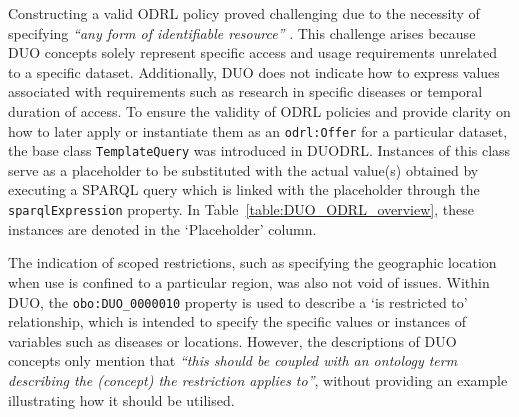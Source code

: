 Constructing a valid ODRL policy proved challenging due to the necessity of specifying \textit{``any form of identifiable resource''} \citep{iannella_odrl_vocab_2018}.
This challenge arises because DUO concepts solely represent specific access and usage requirements unrelated to a specific dataset.
Additionally, DUO does not indicate how to express values associated with requirements such as research in specific diseases or temporal duration of access.
To ensure the validity of ODRL policies and provide clarity on how to later apply or instantiate them as an \texttt{odrl:Offer} for a particular dataset, the base class \texttt{TemplateQuery} was introduced in DUODRL.
Instances of this class serve as a placeholder to be substituted with the actual value(s) obtained by executing a SPARQL query which is linked with the placeholder through the \texttt{sparqlExpression} property.
In Table~\ref{table:DUO_ODRL_overview}, these instances are denoted in the `Placeholder' column.

The indication of scoped restrictions, such as specifying the geographic location when use is confined to a particular region, was also not void of issues.
Within DUO, the \texttt{obo:DUO\_0000010} property is used to describe a `is restricted to' relationship, which is intended to specify the specific values or instances of variables such as diseases or locations.
However, the descriptions of DUO concepts only mention that \textit{``this should be coupled with an ontology term describing the (concept) the restriction applies to''}, without providing an example illustrating how it should be utilised.

